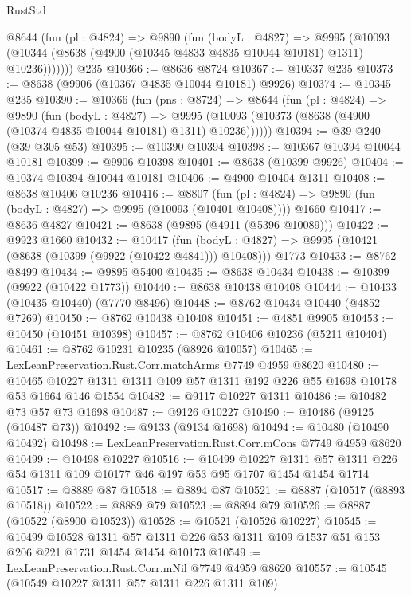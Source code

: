 \begin{lexlean}{RustStd}
\begin{coremodule}
      @8644
        (fun (pl : @4824) =>
        @9890
          (fun (bodyL : @4827) =>
          @9995
            (@10093 (@10344 (@8638 (@4900 (@10345 @4833 @4835 @10044 @10181) @1311) @10236)))))))
    @235
@10366 := @8636 @8724
@10367 := @10337 @235
@10373 := @8638 (@9906 (@10367 @4835 @10044 @10181) @9926)
@10374 := @10345 @235
@10390 := @10366
    (fun (pns : @8724) =>
    @8644
      (fun (pl : @4824) =>
      @9890
        (fun (bodyL : @4827) =>
        @9995 (@10093 (@10373 (@8638 (@4900 (@10374 @4835 @10044 @10181) @1311) @10236))))))
@10394 := @39 @240 (@39 @305 @53)
@10395 := @10390 @10394
@10398 := @10367 @10394 @10044 @10181
@10399 := @9906 @10398
@10401 := @8638 (@10399 @9926)
@10404 := @10374 @10394 @10044 @10181
@10406 := @4900 @10404 @1311
@10408 := @8638 @10406 @10236
@10416 := @8807
    (fun (pl : @4824) => @9890 (fun (bodyL : @4827) => @9995 (@10093 (@10401 @10408))))
    @1660
@10417 := @8636 @4827
@10421 := @8638 (@9895 (@4911 (@5396 @10089)))
@10422 := @9923 @1660
@10432 := @10417
    (fun (bodyL : @4827) => @9995 (@10421 (@8638 (@10399 (@9922 (@10422 @4841))) @10408)))
    @1773
@10433 := @8762 @8499
@10434 := @9895 @5400
@10435 := @8638 @10434
@10438 := @10399 (@9922 (@10422 @1773))
@10440 := @8638 @10438 @10408
@10444 := @10433 (@10435 @10440) (@7770 @8496)
@10448 := @8762 @10434 @10440 (@4852 @7269)
@10450 := @8762 @10438 @10408
@10451 := @4851 @9905
@10453 := @10450 (@10451 @10398)
@10457 := @8762 @10406 @10236 (@5211 @10404)
@10461 := @8762 @10231 @10235 (@8926 @10057)
@10465 := LexLeanPreservation.Rust.Corr.matchArms @7749 @4959 @8620
@10480 := @10465 @10227 @1311 @1311 @109 @57 @1311 @192 @226 @55 @1698 @10178 @53 @1664 @146 @1554
@10482 := @9117 @10227 @1311
@10486 := @10482 @73 @57 @73 @1698
@10487 := @9126 @10227
@10490 := @10486 (@9125 (@10487 @73))
@10492 := @9133 (@9134 @1698)
@10494 := @10480 (@10490 @10492)
@10498 := LexLeanPreservation.Rust.Corr.mCons @7749 @4959 @8620
@10499 := @10498 @10227
@10516 := @10499
    @10227
    @1311
    @57
    @1311
    @226
    @54
    @1311
    @109
    @10177
    @46
    @197
    @53
    @95
    @1707
    @1454
    @1454
    @1714
@10517 := @8889 @87
@10518 := @8894 @87
@10521 := @8887 (@10517 (@8893 @10518))
@10522 := @8889 @79
@10523 := @8894 @79
@10526 := @8887 (@10522 (@8900 @10523))
@10528 := @10521 (@10526 @10227)
@10545 := @10499
    @10528
    @1311
    @57
    @1311
    @226
    @53
    @1311
    @109
    @1537
    @51
    @153
    @206
    @221
    @1731
    @1454
    @1454
    @10173
@10549 := LexLeanPreservation.Rust.Corr.mNil @7749 @4959 @8620
@10557 := @10545 (@10549 @10227 @1311 @57 @1311 @226 @1311 @109)

\end{coremodule}
\end{lexlean}

